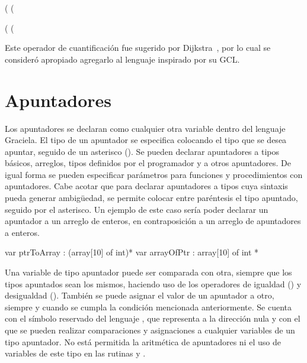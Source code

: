 \begin{gracielacode}[caption=Equivalencia entre cuantificador universal y count, label=lst:forallcount]
(%
    (%
\end{gracielacode}

\begin{gracielacode}[caption=Equivalencia entre cuantificador existencial y count, label=lst:existcount]
(%
    (%
\end{gracielacode}

Este operador de cuantificación fue sugerido por Dijkstra~\cite{ewd737}, por lo
cual se consideró apropiado agregarlo al lenguaje inspirado por su GCL.

\section{Apuntadores}

Los apuntadores se declaran como cualquier otra variable dentro del lenguaje
Graciela. El tipo de un apuntador se especifica colocando el tipo que se desea
apuntar, seguido de un asterisco (\ingra{*}). Se pueden declarar apuntadores a
tipos básicos, arreglos, tipos definidos por el programador y a otros
apuntadores. De igual forma se pueden especificar parámetros para funciones y
procedimientos con apuntadores. Cabe acotar que para declarar apuntadores a
tipos cuya sintaxis pueda generar ambigüedad, se permite colocar entre
paréntesis el tipo apuntado, seguido por el asterisco. Un ejemplo de este caso
sería poder declarar un apuntador a un arreglo de enteros, en contraposición a
un arreglo de apuntadores a enteros.

\begin{gracielacode}[caption=Arreglo de apuntadores y apuntador a arreglo, label=lst:arrPtr]
var ptrToArray : (array[10] of int)*
var arrayOfPtr :  array[10] of int *
\end{gracielacode}

Una variable de tipo apuntador puede ser comparada con otra, siempre que los
tipos apuntados sean los mismos, haciendo uso de los operadores de igualdad
(\ingra{==}) y desigualdad (\ingra{!=}). También se puede asignar el valor
de un apuntador a otro, siempre y cuando se cumpla la condición mencionada
anteriormente. Se cuenta con el símbolo reservado del lenguaje
, que representa a la dirección nula y con el que se pueden
realizar comparaciones y asignaciones a cualquier variables de un
tipo apuntador. No está permitida la aritmética de apuntadores ni el uso de
variables de este tipo en las rutinas  y .


